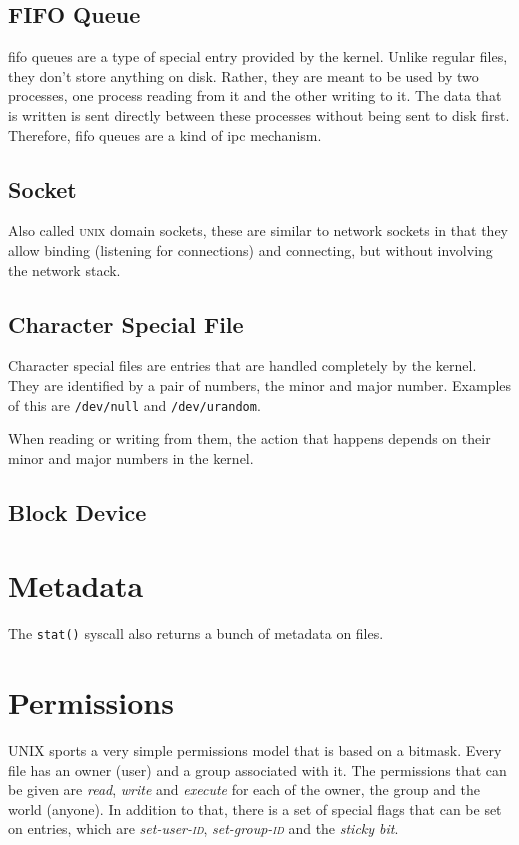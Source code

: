 \documentclass[a4paper]{article}
\begin{document}
\subsection{FIFO Queue}

\gls{fifo} queues are a type of special entry provided by the kernel. Unlike regular files, they don't store anything on disk. Rather, they are meant to be used by two processes, one process reading from it and the other writing to it. The data that is written is sent directly between these processes without being sent to disk first. Therefore, \gls{fifo} queues are a kind of \gls{ipc} mechanism.

\subsection{Socket}

Also called \textsc{unix} domain sockets, these are similar to network sockets in that they allow binding (listening for connections) and connecting, but without involving the network stack.

\subsection{Character Special File}

Character special files are entries that are handled completely by the kernel. They are identified by a pair of numbers, the minor and major number. Examples of this are \verb|/dev/null| and \verb|/dev/urandom|.

When reading or writing from them, the action that happens depends on their minor and major numbers in the kernel.

\subsection{Block Device}

\section{Metadata}

The \verb|stat()| syscall also returns a bunch of metadata on files.

\section{Permissions}

UNIX sports a very simple permissions model that is based on a bitmask. Every file has an owner (user) and a group associated with it. The permissions that can be given are \emph{read}, \emph{write} and \emph{execute} for each of the owner, the group and the world (anyone). In addition to that, there is a set of special flags that can be set on entries, which are \emph{set-user-\textsc{id}}, \emph{set-group-\textsc{id}} and the \emph{sticky bit}.
\end{document}
